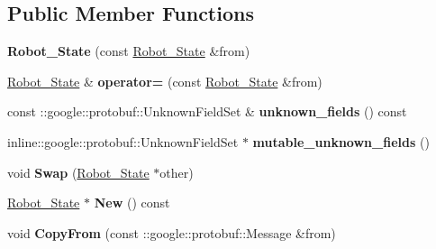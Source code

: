 \subsection*{Public Member Functions}
\begin{DoxyCompactItemize}
\item 
{\bfseries Robot\+\_\+\+State} (const \hyperlink{classvss__state_1_1Robot__State}{Robot\+\_\+\+State} \&from)\hypertarget{classvss__state_1_1Robot__State_a067b968ee504ea53efd93d9aa27c96ca}{}\label{classvss__state_1_1Robot__State_a067b968ee504ea53efd93d9aa27c96ca}

\item 
\hyperlink{classvss__state_1_1Robot__State}{Robot\+\_\+\+State} \& {\bfseries operator=} (const \hyperlink{classvss__state_1_1Robot__State}{Robot\+\_\+\+State} \&from)\hypertarget{classvss__state_1_1Robot__State_ad37aa84870eea581e0406cfb5db502ac}{}\label{classvss__state_1_1Robot__State_ad37aa84870eea581e0406cfb5db502ac}

\item 
const \+::google\+::protobuf\+::\+Unknown\+Field\+Set \& {\bfseries unknown\+\_\+fields} () const \hypertarget{classvss__state_1_1Robot__State_a12a57833a931bfb941527d777fb1d99a}{}\label{classvss__state_1_1Robot__State_a12a57833a931bfb941527d777fb1d99a}

\item 
inline\+::google\+::protobuf\+::\+Unknown\+Field\+Set $\ast$ {\bfseries mutable\+\_\+unknown\+\_\+fields} ()\hypertarget{classvss__state_1_1Robot__State_adda3db07f10ebdb69699bb992976ace3}{}\label{classvss__state_1_1Robot__State_adda3db07f10ebdb69699bb992976ace3}

\item 
void {\bfseries Swap} (\hyperlink{classvss__state_1_1Robot__State}{Robot\+\_\+\+State} $\ast$other)\hypertarget{classvss__state_1_1Robot__State_a4f0475b13ab71a00c88f4662e82decea}{}\label{classvss__state_1_1Robot__State_a4f0475b13ab71a00c88f4662e82decea}

\item 
\hyperlink{classvss__state_1_1Robot__State}{Robot\+\_\+\+State} $\ast$ {\bfseries New} () const \hypertarget{classvss__state_1_1Robot__State_a1ae61a4d15e74bd8210d8943b4cb4d93}{}\label{classvss__state_1_1Robot__State_a1ae61a4d15e74bd8210d8943b4cb4d93}

\item 
void {\bfseries Copy\+From} (const \+::google\+::protobuf\+::\+Message \&from)\hypertarget{classvss__state_1_1Robot__State_ad8ff7bd295e28703ef3b6bdc6dba1435}{}\label{classvss__state_1_1Robot__State_ad8ff7bd295e28703ef3b6bdc6dba1435}


\end{DoxyCompactItemize}
